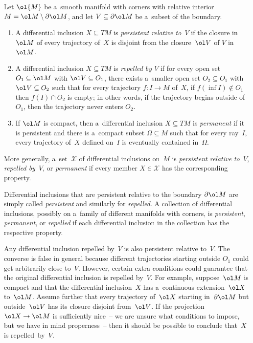 \begin{Definition}
\label{d:persistent}
Let $\ol{M}$ be a~smooth manifold with corners with relative interior $M=\ol M\setminus\partial\ol M$, and let
$V\subseteq\partial\ol M$ be a~subset of the boundary.
\begin{enumerate}\itemsep=0pt
\item A dif\/ferential inclusion $X\subseteq TM$ is \emph{persistent relative to~$V$} if the closure in~$\ol M$ of
every trajectory of~$X$ is disjoint from the closure~$\ol V$ of $V$ in $\ol M$.

\item A dif\/ferential inclusion $X\subseteq TM$ is \emph{repelled by $V$} if for every open set $O_1\subseteq\ol M$
with $\ol V\subseteq O_1$, there exists a~smaller open set $O_2\subseteq O_1$ with $\ol V\subseteq O_2$ such that for
every trajectory $f:I\to M$ of~$X$, if $f(\inf{I})\notin O_1$ then $f(I)\cap O_2$ is empty; in other words, if the
trajectory begins outside of~$O_1$, then the trajectory never enters $O_2$.

\item If $\ol M$ is compact, then a~dif\/ferential inclusion $X\subseteq TM$ is \emph{permanent} if it is persistent
and there is a~compact subset $\Omega\subseteq M$ such that for every ray~$I$, every trajectory of~$X$ def\/ined on~$I$
is eventually contained in~$\Omega$.
\end{enumerate}
More generally, a~set~$\mathcal X$ of dif\/ferential inclusions on~$M$ is \emph{persistent relative to~$V$},
\emph{repelled by~$V$}, or \emph{permanent} if every member $X\in\mathcal X$ has the corresponding property.
\end{Definition}
\begin{Definition}\label{d:persistent'}
Dif\/ferential inclusions that are persistent relative to the boundary $\partial\ol M$ are simply called
\emph{persistent} and similarly for \emph{repelled}.
A collection of dif\/ferential inclusions, possibly on a~family of dif\/ferent manifolds with corners, is
\emph{persistent}, \emph{permanent}, or \emph{repelled} if each dif\/ferential inclusion in the collection has the
respective property.
\end{Definition}
\begin{Remark}\label{r:repelled==>persistent}
Any dif\/ferential inclusion repelled by~$V$ is also persistent relative to~$V$.
The converse is false in general because dif\/ferent trajectories starting outside $O_1$ could get arbitrarily close
to~$V$.
However, certain extra conditions could guarantee that the original dif\/ferential inclusion is repelled by~$V$.
For example, suppose~$\ol M$ is compact and that the dif\/ferential inclusion~$X$ has a~continuous extension~$\ol X$
to~$\ol M$.
Assume further that every trajectory of~$\ol X$ starting in~$\partial\ol M$ but outside~$\ol V$ has its closure
disjoint from~$\ol V$.
If the projection $\ol X\to\ol M$ is suf\/f\/iciently nice~-- we are unsure what conditions to impose, but we have in
mind properness~-- then it should be possible to conclude that~$X$ is repelled~by~$V$.
\end{Remark}

